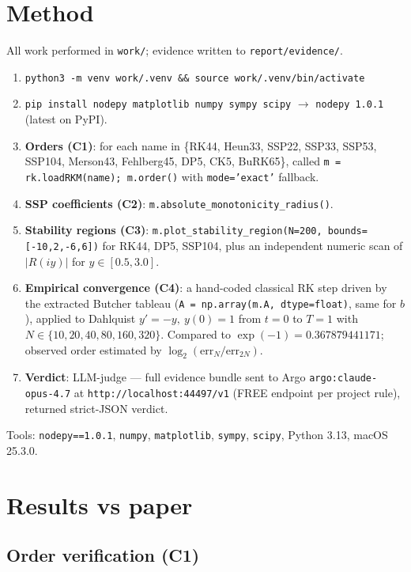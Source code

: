\documentclass[11pt]{article}
\begin{document}
\section{Method}

All work performed in \texttt{work/}; evidence written to
\texttt{report/evidence/}.

\begin{enumerate}
  \item \texttt{python3 -m venv work/.venv \&\& source work/.venv/bin/activate}
  \item \texttt{pip install nodepy matplotlib numpy sympy scipy} $\rightarrow$
        \texttt{nodepy 1.0.1} (latest on PyPI).
  \item \textbf{Orders (C1)}: for each name in
        \{RK44, Heun33, SSP22, SSP33, SSP53, SSP104, Merson43, Fehlberg45,
        DP5, CK5, BuRK65\}, called \texttt{m = rk.loadRKM(name); m.order()}
        with \texttt{mode='exact'} fallback.
  \item \textbf{SSP coefficients (C2)}: \texttt{m.absolute\_monotonicity\_radius()}.
  \item \textbf{Stability regions (C3)}:
        \texttt{m.plot\_stability\_region(N=200, bounds=[-10,2,-6,6])} for
        RK44, DP5, SSP104, plus an independent numeric scan of
        $|R(iy)|$ for $y \in [0.5, 3.0]$.
  \item \textbf{Empirical convergence (C4)}: a hand-coded classical RK step
        driven by the extracted Butcher tableau
        (\texttt{A = np.array(m.A, dtype=float)}, same for $b$), applied to
        Dahlquist $y' = -y,\ y(0) = 1$ from $t=0$ to $T=1$ with
        $N \in \{10, 20, 40, 80, 160, 320\}$. Compared to
        $\exp(-1) = 0.367879441171$; observed order estimated by
        $\log_2(\text{err}_N / \text{err}_{2N})$.
  \item \textbf{Verdict}: LLM-judge --- full evidence bundle sent to Argo
        \texttt{argo:claude-opus-4.7} at \texttt{http://localhost:44497/v1}
        (FREE endpoint per project rule), returned strict-JSON verdict.
\end{enumerate}

Tools: \texttt{nodepy==1.0.1}, \texttt{numpy}, \texttt{matplotlib},
\texttt{sympy}, \texttt{scipy}, Python 3.13, macOS 25.3.0.

\section{Results vs paper}

\subsection{Order verification (C1)}
\end{document}
